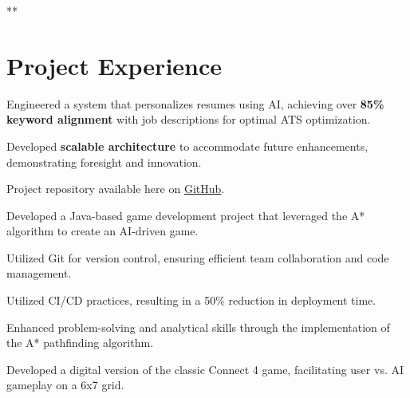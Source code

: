 **
\section{Project Experience}


\begin{tightemize}
    \item Engineered a system that personalizes resumes using AI, achieving over \textbf{85\% keyword alignment} with job descriptions for optimal ATS optimization.
    \item Developed \textbf{scalable architecture} to accommodate future enhancements, demonstrating foresight and innovation.
    \item Project repository available here on \href{https://github.com/vmsaif/ats-pass-ai}{\ul{GitHub}}.
\end{tightemize}


\begin{tightemize}
    \item Developed a Java-based game development project that leveraged the A* algorithm to create an AI-driven game.
    \item Utilized Git for version control, ensuring efficient team collaboration and code management.
    \item Utilized CI/CD practices, resulting in a 50\% reduction in deployment time.
    \item Enhanced problem-solving and analytical skills through the implementation of the A* pathfinding algorithm.
\end{tightemize}



\begin{tightemize}
    \item Developed a digital version of the classic Connect 4 game, facilitating user vs. AI gameplay on a 6x7 grid.
\end{tightemize}